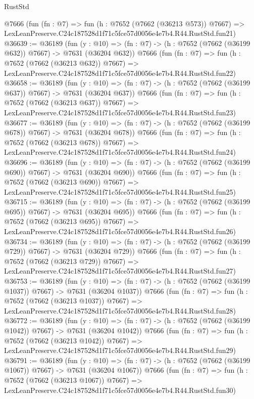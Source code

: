 \begin{lexlean}{RustStd}
\begin{coremodule}
    @7666
    (fun (fn : @7) =>
    fun (h : @7652 (@7662 (@36213 @573)) @7667) =>
    LexLeanPreserve.C24c187528d1f71c5fce57d0056e4e7b4.R44.RustStd.fun21)
@36639 := @36189
    (fun (y : @10) => (fn : @7) -> (h : @7652 (@7662 (@36199 @632)) @7667) -> @7631 (@36204 @632))
    @7666
    (fun (fn : @7) =>
    fun (h : @7652 (@7662 (@36213 @632)) @7667) =>
    LexLeanPreserve.C24c187528d1f71c5fce57d0056e4e7b4.R44.RustStd.fun22)
@36658 := @36189
    (fun (y : @10) => (fn : @7) -> (h : @7652 (@7662 (@36199 @637)) @7667) -> @7631 (@36204 @637))
    @7666
    (fun (fn : @7) =>
    fun (h : @7652 (@7662 (@36213 @637)) @7667) =>
    LexLeanPreserve.C24c187528d1f71c5fce57d0056e4e7b4.R44.RustStd.fun23)
@36677 := @36189
    (fun (y : @10) => (fn : @7) -> (h : @7652 (@7662 (@36199 @678)) @7667) -> @7631 (@36204 @678))
    @7666
    (fun (fn : @7) =>
    fun (h : @7652 (@7662 (@36213 @678)) @7667) =>
    LexLeanPreserve.C24c187528d1f71c5fce57d0056e4e7b4.R44.RustStd.fun24)
@36696 := @36189
    (fun (y : @10) => (fn : @7) -> (h : @7652 (@7662 (@36199 @690)) @7667) -> @7631 (@36204 @690))
    @7666
    (fun (fn : @7) =>
    fun (h : @7652 (@7662 (@36213 @690)) @7667) =>
    LexLeanPreserve.C24c187528d1f71c5fce57d0056e4e7b4.R44.RustStd.fun25)
@36715 := @36189
    (fun (y : @10) => (fn : @7) -> (h : @7652 (@7662 (@36199 @695)) @7667) -> @7631 (@36204 @695))
    @7666
    (fun (fn : @7) =>
    fun (h : @7652 (@7662 (@36213 @695)) @7667) =>
    LexLeanPreserve.C24c187528d1f71c5fce57d0056e4e7b4.R44.RustStd.fun26)
@36734 := @36189
    (fun (y : @10) => (fn : @7) -> (h : @7652 (@7662 (@36199 @729)) @7667) -> @7631 (@36204 @729))
    @7666
    (fun (fn : @7) =>
    fun (h : @7652 (@7662 (@36213 @729)) @7667) =>
    LexLeanPreserve.C24c187528d1f71c5fce57d0056e4e7b4.R44.RustStd.fun27)
@36753 := @36189
    (fun (y : @10) => (fn : @7) -> (h : @7652 (@7662 (@36199 @1037)) @7667) -> @7631 (@36204 @1037))
    @7666
    (fun (fn : @7) =>
    fun (h : @7652 (@7662 (@36213 @1037)) @7667) =>
    LexLeanPreserve.C24c187528d1f71c5fce57d0056e4e7b4.R44.RustStd.fun28)
@36772 := @36189
    (fun (y : @10) => (fn : @7) -> (h : @7652 (@7662 (@36199 @1042)) @7667) -> @7631 (@36204 @1042))
    @7666
    (fun (fn : @7) =>
    fun (h : @7652 (@7662 (@36213 @1042)) @7667) =>
    LexLeanPreserve.C24c187528d1f71c5fce57d0056e4e7b4.R44.RustStd.fun29)
@36791 := @36189
    (fun (y : @10) => (fn : @7) -> (h : @7652 (@7662 (@36199 @1067)) @7667) -> @7631 (@36204 @1067))
    @7666
    (fun (fn : @7) =>
    fun (h : @7652 (@7662 (@36213 @1067)) @7667) =>
    LexLeanPreserve.C24c187528d1f71c5fce57d0056e4e7b4.R44.RustStd.fun30)

\end{coremodule}
\end{lexlean}

